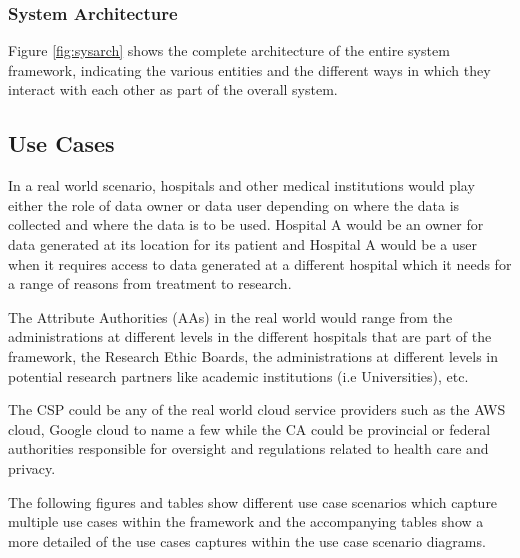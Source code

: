 \subsubsection{System Architecture}

Figure \ref{fig:sysarch} shows the complete architecture of the entire system framework, indicating the various entities and the different ways in which they interact with each other as part of the overall system.

\subsection{Use Cases}

In a real world scenario, hospitals and other medical institutions would play either the role of data owner or data user depending on where the data is collected and where the data is to be used. Hospital A would be an owner for data generated at its location for its patient and Hospital A would be a user when it requires access to data generated at a different hospital which it needs for a range of reasons from treatment to research.

The Attribute Authorities (AAs) in the real world would range from the administrations at different levels in the different hospitals that are part of the framework, the Research Ethic Boards, the administrations at different levels in potential research partners like academic institutions (i.e Universities), etc.

The CSP could be any of the real world cloud service providers such as the AWS cloud, Google cloud to name a few while the CA could be provincial or federal authorities responsible for oversight and regulations related to health care and privacy.

The following figures and tables show different use case scenarios which capture multiple use cases within the framework and the accompanying tables show a more detailed of the use cases captures within the use case scenario diagrams.




